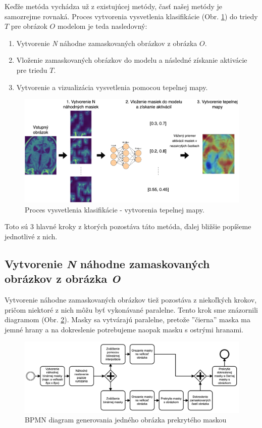 Keďže metóda vychádza už z existujúcej metódy, časť našej metódy je samozrejme rovnaká. Proces vytvorenia vysvetlenia klasifikácie (Obr. \ref{fig:risei_heatmap_generation}) do triedy $T$ pre obrázok $O$ modelom je teda nasledovný:

\begin{enumerate}
    \item Vytvorenie \textit{N} náhodne zamaskovaných obrázkov z obrázka $O$.
    \item Vloženie zamaskovaných obrázkov do modelu a následné získanie aktivácie pre triedu $T$.
    \item Vytvorenie a vizualizácia vysvetlenia pomocou tepelnej mapy.
\end{enumerate}

\begin{figure}[h!]
    \centering
    \includegraphics[scale=0.35]{assets/images/risei_heatmap_generation.png}
    \caption{Proces vysvetlenia klasifikácie - vytvorenia tepelnej mapy.}
    \label{fig:risei_heatmap_generation}
\end{figure}

Toto sú 3 hlavné kroky z ktorých pozostáva táto metóda, ďalej bližšie popíšeme jednotlivé z nich.

\subsection{Vytvorenie \textit{N} náhodne zamaskovaných obrázkov z obrázka \textit{O}}

Vytvorenie náhodne zamaskovaných obrázkov tiež pozostáva z niekoľkých krokov, pričom niektoré z nich môžu byť vykonávané paralelne. Tento krok sme znázornili diagramom (Obr. \ref{fig:risei_diagram}). Masky sa vytvárajú paralelne, pretože ''čierna'' maska ma jemné hrany a na dokreslenie potrebujeme naopak masku s ostrými hranami.

\begin{figure}[h!]
    \centering
    \includegraphics[scale=0.45]{assets/images/risei_diagram.png}
    \caption{BPMN diagram generovania jedného obrázka prekrytého maskou}
    \label{fig:risei_diagram}
\end{figure}

